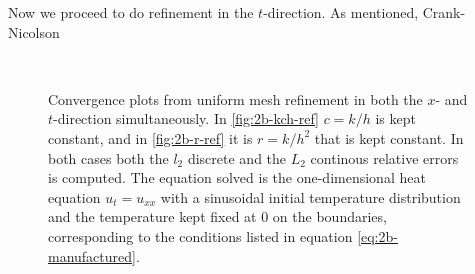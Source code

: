 Now we proceed to do refinement in the $t$-direction. 
As mentioned, Crank-Nicolson

\begin{figure}
    \centering
    \label{fig:2b-kch-r-ref}
    \subfloat[Convergence plots from uniform refinement with constant $c=k/h$.]{
        
        \label{fig:2b-kch-ref}
    } \\ \medskip
    \subfloat[Convergence plots from uniform refinement with constant $r=k/h^2$.]{
        
        \label{fig:2b-r-ref}
    }
    \caption{
        Convergence plots from uniform mesh refinement in both the $x$- and $t$-direction simultaneously. 
        In \ref{fig:2b-kch-ref} $c=k/h$ is kept constant, 
        and in \ref{fig:2b-r-ref} it is $r=k/h^2$ that is kept constant. 
        In both cases 
        both the $l_2$ discrete and the $L_2$ continous relative errors is computed. 
        The equation solved is the one-dimensional heat equation $u_t=u_{xx}$ 
        with a sinusoidal initial temperature distribution and the temperature kept fixed at $0$ 
        on the boundaries, 
        corresponding to the conditions listed in equation \eqref{eq:2b-manufactured}. 
    }
\end{figure}


%
%    


